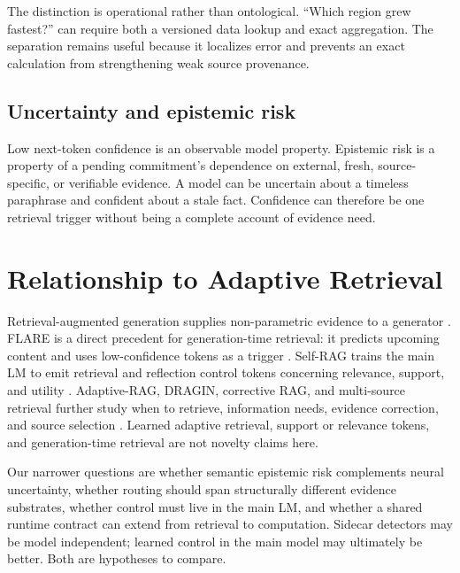 \documentclass[11pt]{article}
\begin{document}
The distinction is operational rather than ontological.  ``Which region grew
fastest?'' can require both a versioned data lookup and exact aggregation.  The
separation remains useful because it localizes error and prevents an exact
calculation from strengthening weak source provenance.

\subsection{Uncertainty and epistemic risk}

Low next-token confidence is an observable model property.  Epistemic risk is
a property of a pending commitment's dependence on external, fresh,
source-specific, or verifiable evidence.  A model can be uncertain about a
timeless paraphrase and confident about a stale fact.  Confidence can therefore
be one retrieval trigger without being a complete account of evidence need.

\section{Relationship to Adaptive Retrieval}

Retrieval-augmented generation supplies non-parametric evidence to a generator
\cite{rag}.  FLARE is a direct precedent for generation-time retrieval: it
predicts upcoming content and uses low-confidence tokens as a trigger
\cite{flare}.  Self-RAG trains the main LM to emit retrieval and reflection
control tokens concerning relevance, support, and utility \cite{selfrag}.
Adaptive-RAG, DRAGIN, corrective RAG, and multi-source retrieval further study
when to retrieve, information needs, evidence correction, and source selection
\cite{adaptiverag,dragin,crag,mspr}.  Learned adaptive retrieval, support or
relevance tokens, and generation-time retrieval are not novelty claims here.

Our narrower questions are whether semantic epistemic risk complements neural
uncertainty, whether routing should span structurally different evidence
substrates, whether control must live in the main LM, and whether a shared
runtime contract can extend from retrieval to computation.  Sidecar detectors
may be model independent; learned control in the main model may ultimately be
better.
Both are hypotheses to compare.
\end{document}

